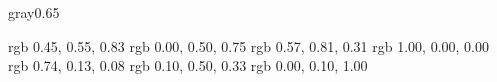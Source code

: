 
\definecolor{lightgray}   {gray}{0.65}


\definecolor{lightblue}     {rgb} {0.45, 0.55, 0.83}
\definecolor{zf_blue}       {rgb} {0.00, 0.50, 0.75}
\definecolor{table_green}   {rgb} {0.57, 0.81, 0.31}
\definecolor{table_red}     {rgb} {1.00, 0.00, 0.00}
\definecolor{snippet_red}   {rgb} {0.74, 0.13, 0.08}
\definecolor{snippet_green} {rgb} {0.10, 0.50, 0.33}
\definecolor{snippet_blue}  {rgb} {0.00, 0.10, 1.00}